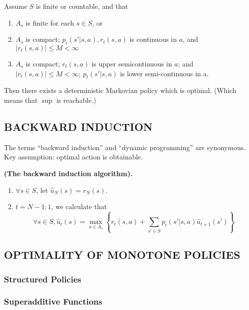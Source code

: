 \begin{proposition}
    Assume $ S $  is finite or countable, and that
    \begin{enumerate}
        \item $ A_s $  is finite for each $ s \in S $, or
        \item $ A_s $ is compact; $ p_t(s' | s, a), r_t(s,a) $ is continuous in $ a $, and $ |r_t(s,a)| \le M < \infty $
        \item $ A_s $ is compact; $ r_t(s,a) $ is upper semicontinuous in $ a $; and $ |r_t(s,a)| \le M < \infty $; $ p_t(s'|s,a) $ is lower semi-continuous in a.
    \end{enumerate}
    Then there exists a deterministic Markovian policy which is optimal. (Which means that $ \sup $ is reachable.)
\end{proposition}

\subsection{BACKWARD INDUCTION}%
\label{sub:backward_induction}

The terms ``backward induction'' and ``dynamic programming'' are synonymous.
Key assumption: optimal action is obtainable.

\begin{definition}
    \textbf{(The backward induction algorithm).}
    \begin{enumerate}
        \item $ \forall s \in S$, let $ \hat u_N(s) = r_N(s)$.
        \item $ t = N-1 : 1 $, we calculate that
            \[
                \forall s \in S, \hat u_t(s) = \max_{a \in A_{s}} \left\{ r_t(s, a) + \sum^{}_{s' \in S} p_t(s' | s, a) \hat u_{t+1}(s') \right\}
            \]
    \end{enumerate}
\end{definition}

\subsection{OPTIMALITY OF MONOTONE POLICIES}%
\label{sub:optimality_of_monotone_policies}

\subsubsection{Structured Policies}%

\subsubsection{Superadditive Functions}

